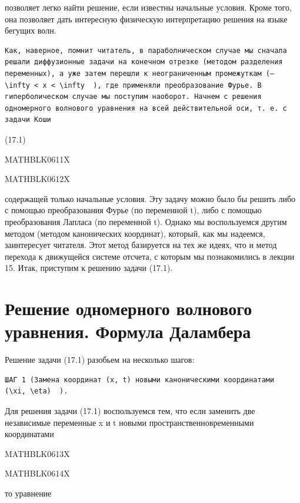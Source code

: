 \documentclass[
]{article}
\begin{document}
позволяет легко найти решение, если известны начальные условия. Кроме
того, она позволяет дать интересную физическую интерпретацию решения на
языке бегущих волн.

\begin{verbatim}
Как, наверное, помнит читатель, в параболническом случае мы сначала решали диффузионные задачи на конечном отрезке (методом разделения переменных), а уже затем перешли к неограниченным промежуткам (—   \infty < x < \infty  ), где применяли преобразование Фурье. В гиперболическом случае мы поступим наоборот. Начнем с решения одномерного волнового уравнения на всей действительной оси, т. е. с задачи Коши
\end{verbatim}

(17.1)

MATHBLK0611X

MATHBLK0612X

содержащей только начальные условия. Эту задачу можно было бы решить
либо с помощью преобразования Фурье (по переменной t), либо с помощью
преобразования Лапласа (по переменной t). Однако мы воспользуемся другим
методом (методом канонических координат), который, как мы надеемся,
заинтересует читателя. Этот метод базируется на тех же идеях, что и
метод перехода к движущейся системе отсчета, с которым мы познакомились
в лекции 15. Итак, приступим к решению задачи (17.1).

\section{Решение одномерного волнового уравнения. Формула
Даламбера}\label{ux440ux435ux448ux435ux43dux438ux435-ux43eux434ux43dux43eux43cux435ux440ux43dux43eux433ux43e-ux432ux43eux43bux43dux43eux432ux43eux433ux43e-ux443ux440ux430ux432ux43dux435ux43dux438ux44f.-ux444ux43eux440ux43cux443ux43bux430-ux434ux430ux43bux430ux43cux431ux435ux440ux430}

Решение задачи (17.1) разобьем на несколько шагов:

\begin{verbatim}
ШАГ 1 (Замена координат (x, t) новыми каноническими координатами   (\xi, \eta)  ).
\end{verbatim}

Для решения задачи (17.1) воспользуемся тем, что если заменить две
независимые переменные x и t новыми пространственновременными
координатами

MATHBLK0613X

MATHBLK0614X

то уравнение
\end{document}
